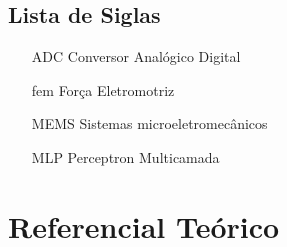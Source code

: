 \documentclass[capchap,capsec,sumarioincompleto,a4paper,12pt,plainheader,normaltoc]{utfprtex}%
\begin{document}
\listadefiguras
\listadetabelas

\newpage
\section*{\textbf{Lista de Siglas}}
\vspace{10mm}

\begin{itemize}
	\item[ADC] \hspace{30mm} Conversor Analógico Digital
	\item[fem] \hspace{30mm} Força Eletromotriz
	\item[MEMS] \hspace{30mm} Sistemas microeletromecânicos
	\item[MLP] \hspace{30mm} Perceptron Multicamada
\end{itemize}


\sumario


\chapter{Referencial Teórico}













\apendice

 

  
\end{document}
